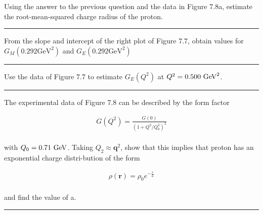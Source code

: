 \begin{problem}{7.5}
    Using the answer to the previous question and the data in Figure 7.8a, estimate the root-mean-squared charge
    radius of the proton.
\end{problem}
\begin{solution}

\end{solution}

\noindent\rule{7in}{1.5pt}


\begin{problem}{7.6}
    From the slope and intercept of the right plot of Figure 7.7, obtain values for $G_M(0.292\text{GeV}^2 )$ and
    $G_E(0.292\text{GeV}^2)$
\end{problem}
\begin{solution}

\end{solution}

\noindent\rule{7in}{1.5pt}


\begin{problem}{7.7}
    Use the data of Figure 7.7 to estimate $G_E (Q^2 )$ at $Q^2 = 0.500 \text{ GeV}^2 $.
\end{problem}
\begin{solution}

\end{solution}

\noindent\rule{7in}{1.5pt}


\begin{problem}{7.8}
    The experimental data of Figure 7.8 can be described by the form factor

    \begin{align*}
        G(Q^2)= \frac{G(0)}{\left( 1+Q^2/Q_0^2 \right)^2}
    \end{align*}\\
    with $Q_0 = 0.71 \text{ GeV}$. Taking $Q_2 \approx \mathbf{q}^2$, show that this implies that proton has an exponential charge distri-bution of the form

    \begin{align*}
        \rho(\mathbf{r}) = \rho_0 e^{-\frac{r}{a}}
    \end{align*}\\
    and find the value of a.
\end{problem}
\begin{solution}

\end{solution}

\noindent\rule{7in}{1.5pt}

